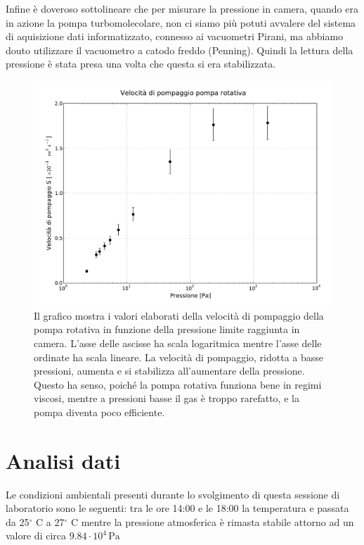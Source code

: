 Infine è doveroso sottolineare che per misurare la pressione in camera, quando era in azione la pompa turbomolecolare,
non ci siamo più potuti avvalere del sistema di aquisizione dati informatizzato, connesso ai vacuometri Pirani, ma abbiamo douto utilizzare
il vacuometro a catodo freddo (Penning). Quindi la lettura della pressione è stata presa una volta che questa si era stabilizzata.  

\begin{figure}[b!]
	\centering
		\includegraphics[width = 15cm]{rotativa.pdf}
	\caption{Il grafico mostra i valori elaborati della velocità di pompaggio della pompa rotativa in funzione della pressione limite raggiunta in camera. L'asse delle ascisse ha scala logaritmica mentre l'asse delle ordinate ha scala lineare. La velocità di pompaggio, ridotta a basse pressioni, aumenta e si stabilizza all'aumentare della pressione. Questo ha senso, poiché la pompa rotativa funziona bene in regimi viscosi, mentre a pressioni basse il gas è troppo rarefatto, e la pompa diventa poco efficiente.}
		\label{fig:rotativa}
\end{figure}

\section{Analisi dati}

Le condizioni ambientali presenti durante lo svolgimento di questa sessione di laboratorio sono le seguenti: tra le ore 14:00 e le 18:00 la temperatura e passata da 25$^\circ$ C a 27$^\circ$ C mentre la pressione atmosferica è rimasta stabile attorno ad un valore di circa $9.84 \cdot 10^4\, \si{\Pa}$

